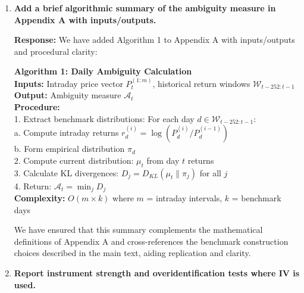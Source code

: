 \documentclass[12pt]{article}
\begin{document}
\begin{enumerate}
\begin{responsebox}
    \vspace{0.5cm}
    We have cross-checked that these symbols are used uniformly in captions, footnotes, and the mediation section to prevent confusion.
    \end{responsebox}

    \item \textbf{Add a brief algorithmic summary of the ambiguity measure in Appendix A with inputs/outputs.}

    \begin{responsebox}
    \vspace{0.5cm}
    \textbf{Response:} We have added Algorithm 1 to Appendix A with inputs/outputs and procedural clarity:

    \begin{minipage}{\textwidth}
    \textbf{Algorithm 1: Daily Ambiguity Calculation}\\
    \textbf{Inputs:} Intraday price vector $P_{t}^{(1:m)}$, historical return windows $\mathcal{W}_{t-252:t-1}$\\
    \textbf{Output:} Ambiguity measure $\mathcal{A}_t$\\
    \textbf{Procedure:}\\
    1. Extract benchmark distributions: For each day $d \in \mathcal{W}_{t-252:t-1}$:\\
    \quad a. Compute intraday returns $r^{(i)}_d = \log(P^{(i)}_d/P^{(i-1)}_d)$\\
    \quad b. Form empirical distribution $\pi_d$\\
    2. Compute current distribution: $\mu_t$ from day $t$ returns\\
    3. Calculate KL divergences: $D_j = D_{KL}(\mu_t \| \pi_j)$ for all $j$\\
    4. Return: $\mathcal{A}_t = \min_j D_j$\\
    \textbf{Complexity:} $O(m \times k)$ where $m$ = intraday intervals, $k$ = benchmark days
    \end{minipage}
    
    \vspace{0.5cm}
    We have ensured that this summary complements the mathematical definitions of Appendix A and cross-references the benchmark construction choices described in the main text, aiding replication and clarity.
    \end{responsebox}

    \item \textbf{Report instrument strength and overidentification tests where IV is used.}


\end{enumerate}
\end{document}
